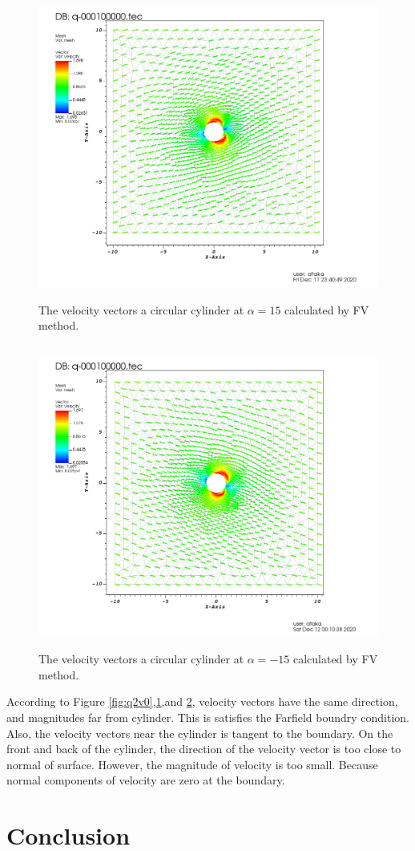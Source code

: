 \documentclass[letterpaper,12pt]{article}
\begin{document}
\begin{figure} [ht]
	\centering
	\includegraphics[height = 10cm]{graph/15deg/Cylinder_15angle_vector0000.png}
	\caption{The velocity vectors a circular cylinder at $\alpha=15$ calculated by FV method.}
    \label{fig:q2v15}
\end{figure}
\begin{figure} [ht]
	\centering
	\includegraphics[height = 10cm]{graph/neg15deg/Cylinder_neg15angle_vector0000.png}
	\caption{The velocity vectors a circular cylinder at $\alpha=-15$ calculated by FV method.}
    \label{fig:q2v-15}
\end{figure}
According to Figure \ref{fig:q2v0},\ref{fig:q2v15},and \ref{fig:q2v-15}, velocity vectors have the 
same direction, and magnitudes far from cylinder. This is satisfies the Farfield boundry condition.
Also, the velocity vectors near the cylinder is tangent to the boundary. On the front and back of the 
cylinder, the direction of the velocity vector is too close to normal of surface. However, the 
magnitude of velocity is too small. Because normal components of velocity are zero at the boundary.





\section{Conclusion}
\end{document}
